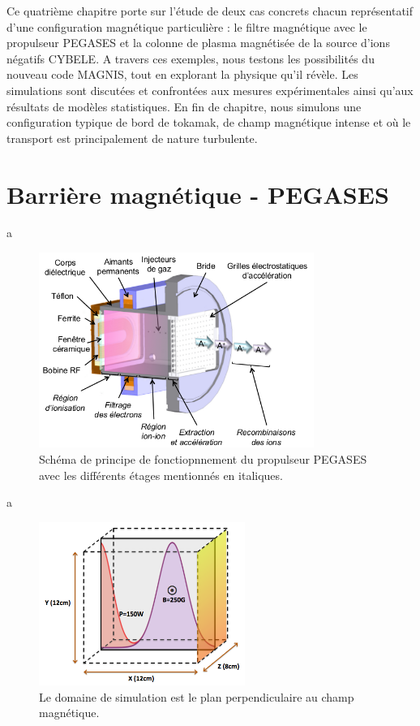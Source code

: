 \begin{refsection}
Ce quatrième chapitre porte sur l'étude de deux cas concrets
chacun représentatif d'une configuration magnétique particulière : le filtre
magnétique avec le propulseur PEGASES et la colonne de plasma magnétisée de la
source d'ions négatifs CYBELE. 
A travers ces exemples, nous testons les possibilités du nouveau code MAGNIS,
tout en explorant la physique qu'il révèle. Les simulations sont discutées et
confrontées aux mesures expérimentales ainsi qu'aux résultats de modèles
statistiques.
En fin de chapitre, nous simulons une configuration typique de bord de tokamak,
de champ magnétique intense et où le transport est principalement de nature
turbulente. 
		 
\section{Barrière magnétique - PEGASES}
a

\begin{figure}[htbp]
\centering
\includegraphics[width=0.8\textwidth]{figures/4-pegases3D.png}
{\caption{Schéma de principe de fonctiopnnement du propulseur PEGASES avec les
différents étages mentionnés en italiques\parencite{Popelier}.}
\label{4-pegasesSimDomain}}
\end{figure}

a

\begin{figure}[htbp]
\centering
\includegraphics[width=0.6\textwidth]{figures/4-pegasesSimDomain.png}
{\caption{Le domaine de simulation est le plan perpendiculaire au champ
magnétique.}
\label{4-pegasesSimDomain}}
\end{figure}


\end{refsection}
